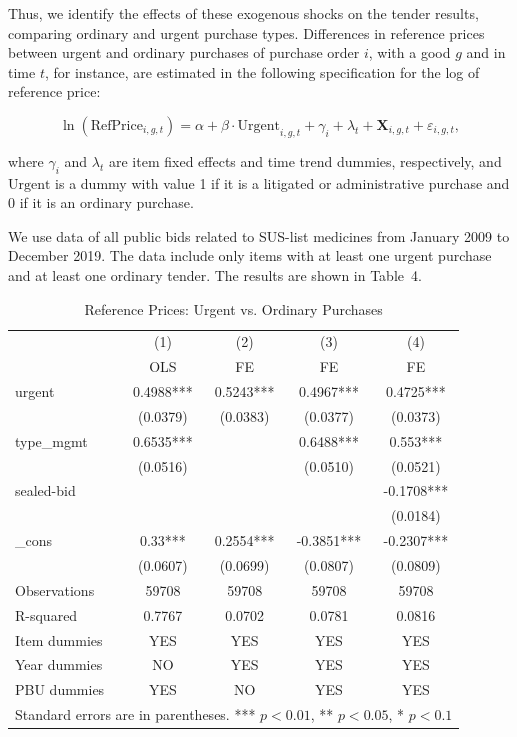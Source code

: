 Thus, we identify the effects of these exogenous shocks on the tender results, comparing ordinary and urgent purchase types. Differences in reference prices between urgent and ordinary purchases of purchase order $i$, with a good $g$ and in time $t$, for instance, are estimated in the following specification for the log of reference price:

\[
\ln(\text{RefPrice}_{i,g,t}) = \alpha + \beta \cdot \text{Urgent}_{i,g,t} + \gamma_{i} + \lambda_{t} + \mathbf{X}_{i,g,t} + \varepsilon_{i,g,t},
\]

where $\gamma_{i}$ and $\lambda_{t}$ are item fixed effects and time trend dummies, respectively, and $\text{Urgent}$ is a dummy with value 1 if it is a litigated or administrative purchase and 0 if it is an ordinary purchase.

We use data of all public bids related to SUS-list medicines from January 2009 to December 2019. The data include only items with at least one urgent purchase and at least one ordinary tender. The results are shown in Table~4.

\begin{table}[ht]
  \centering
  \caption{Reference Prices: Urgent vs. Ordinary Purchases}
  \begin{tabular}{lcccc}
    \hline
           & (1)        & (2)        & (3)        & (4)        \\
           & OLS       & FE         & FE         & FE         \\
    \hline
    urgent     & 0.4988*** & 0.5243*** & 0.4967*** & 0.4725*** \\
               & (0.0379)  & (0.0383)  & (0.0377)  & (0.0373)  \\
    type\_mgmt & 0.6535*** &           & 0.6488*** & 0.553***  \\
               & (0.0516)  &           & (0.0510)  & (0.0521)  \\
    sealed-bid &           &           &           & -0.1708*** \\
               &           &           &           & (0.0184)  \\
    \_cons     & 0.33***   & 0.2554*** & -0.3851*** & -0.2307*** \\
               & (0.0607)  & (0.0699)  & (0.0807)  & (0.0809)  \\
    Observations & 59708   & 59708     & 59708     & 59708     \\
    R-squared  & 0.7767    & 0.0702    & 0.0781    & 0.0816    \\
    Item dummies & YES     & YES       & YES       & YES       \\
    Year dummies & NO      & YES       & YES       & YES       \\
    PBU dummies & YES      & NO        & YES       & YES       \\
    \hline
    \multicolumn{5}{l}{\footnotesize Standard errors are in parentheses. *** $p<0.01$, ** $p<0.05$, * $p<0.1$}
  \end{tabular}
\end{table}

